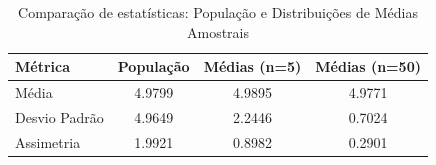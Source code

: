 \begin{table}[h]
\centering
\begin{tabular}{|l|c|c|c|}
\hline
\textbf{Métrica} & \textbf{População} & \textbf{Médias (n=5)} & \textbf{Médias (n=50)} \\
\hline
Média & 4.9799 & 4.9895 & 4.9771 \\
\hline
Desvio Padrão & 4.9649 & 2.2446 & 0.7024 \\
\hline
Assimetria & 1.9921 & 0.8982 & 0.2901 \\
\hline

\end{tabular}
\caption{Comparação de estatísticas: População e Distribuições de Médias Amostrais}
\label{tab:assimetria}
\end{table}